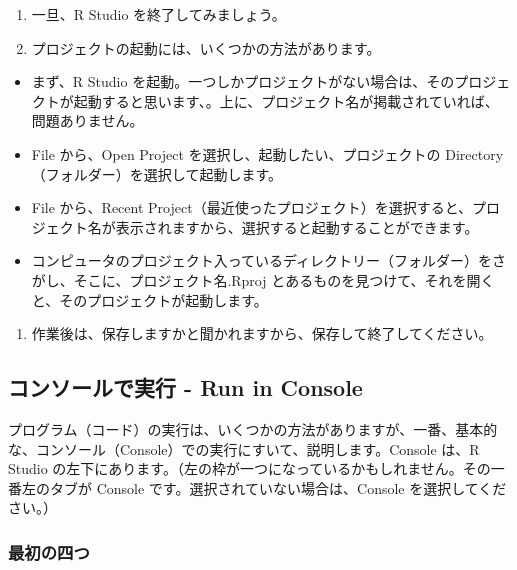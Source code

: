 \documentclass[
]{bxjsbook}
\providecommand{\tightlist}{%
  \setlength{\itemsep}{0pt}\setlength{\parskip}{0pt}}
\theoremstyle{definition}
\theoremstyle{definition}
\theoremstyle{definition}
\theoremstyle{definition}
\theoremstyle{remark}
\begin{document}
\begin{enumerate}
\def\labelenumi{\arabic{enumi}.}
\setcounter{enumi}{2}
\item
  一旦、R Studio を終了してみましょう。
\item
  プロジェクトの起動には、いくつかの方法があります。
\end{enumerate}

\begin{itemize}
\tightlist
\item
  まず、R Studio を起動。一つしかプロジェクトがない場合は、そのプロジェクトが起動すると思います、。上に、プロジェクト名が掲載されていれば、問題ありません。
\item
  File から、Open Project を選択し、起動したい、プロジェクトの Directory（フォルダー）を選択して起動します。
\item
  File から、Recent Project（最近使ったプロジェクト）を選択すると、プロジェクト名が表示されますから、選択すると起動することができます。
\item
  コンピュータのプロジェクト入っているディレクトリー（フォルダー）をさがし、そこに、プロジェクト名.Rproj とあるものを見つけて、それを開くと、そのプロジェクトが起動します。
\end{itemize}

\begin{enumerate}
\def\labelenumi{\arabic{enumi}.}
\setcounter{enumi}{4}
\tightlist
\item
  作業後は、保存しますかと聞かれますから、保存して終了してください。
\end{enumerate}

\hypertarget{ux30b3ux30f3ux30bdux30fcux30ebux3067ux5b9fux884c---run-in-console}{%
\subsection{コンソールで実行 - Run in Console}\label{ux30b3ux30f3ux30bdux30fcux30ebux3067ux5b9fux884c---run-in-console}}

プログラム（コード）の実行は、いくつかの方法がありますが、一番、基本的な、コンソール（Console）での実行にすいて、説明します。Console は、R Studio の左下にあります。（左の枠が一つになっているかもしれません。その一番左のタブが Console です。選択されていない場合は、Console を選択してください。）

\hypertarget{ux6700ux521dux306eux56dbux3064}{%
\subsubsection{最初の四つ}\label{ux6700ux521dux306eux56dbux3064}}
\end{document}
